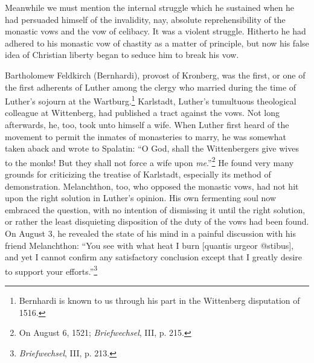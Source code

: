 Meanwhile we must mention the internal struggle which he sustained when
he had persuaded himself of the invalidity, nay, absolute
reprehensibility of the monastic vows and the vow of celibacy. It
was a violent struggle. Hitherto he had adhered to his monastic vow
of chastity as a matter of principle, but now his false idea of Christian
liberty began to seduce him to break his vow.

Bartholomew Feldkirch (Bernhardi), provost of Kronberg, was
the first, or one of the first adherents of Luther among the clergy
who married during the time of Luther’s sojourn at the Wartburg.\footnote
{Bernhardi is known to us through his part in the Wittenberg disputation of 1516.}
Karlstadt, Luther’s tumultuous theological colleague at Wittenberg,
had published a tract against the vows. Not long afterwards, he,
too, took unto himself a wife. When Luther first heard of the movement
to permit the inmates of monasteries to marry, he was
somewhat taken aback and wrote to Spalatin: “O God, shall the Wittenbergers
give wives to the monks! But they shall not force a wife
upon \textit{me}.”\footnote{On August 6, 1521; \textit{Briefwechsel}, III, p. 215.}
He found very many grounds for criticizing the treatise of Karlstadt, especially
its method of demonstration. Melanchthon, too, who opposed the monastic vows, had not hit upon the
right solution in Luther’s opinion. His own fermenting soul now
embraced the question, with no intention of dismissing it until the
right solution, or rather the least disquieting disposition of the duty of
the vows had been found. On August 3, he revealed the state of his
mind in a painful discussion with his friend Melanchthon: “You see
with what heat I burn [quantis urgeor @stibus], and yet I cannot
confirm any satisfactory conclusion except that I greatly desire to
support your efforts.”\footnote{\textit{Briefwechsel}, III, p. 213.}

